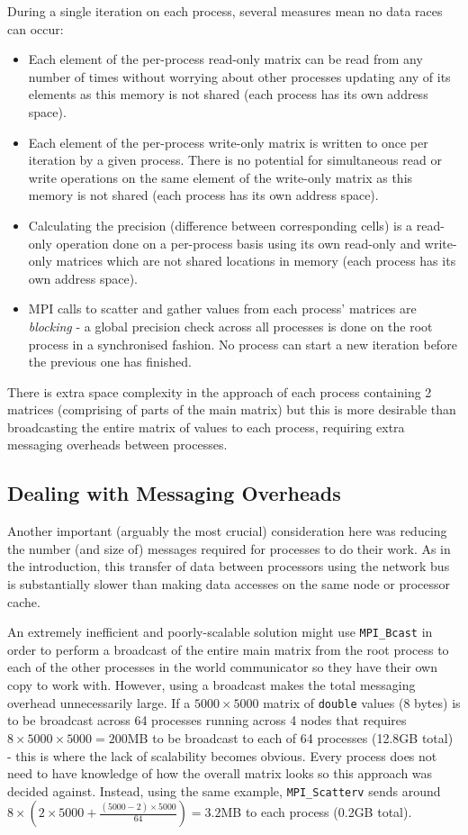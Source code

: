 \documentclass[11pt]{article}
\begin{document}
During a single iteration on each process, several measures mean no data races can occur:
\begin{itemize}
\item Each element of the per-process read-only matrix can be read from any number of times without worrying about other processes updating any of its elements as this memory is not shared (each process has its own address space). 
\item Each element of the per-process write-only matrix is written to once per iteration by a given process. There is no potential for simultaneous read or write operations on the same element of the write-only matrix  as this memory is not shared (each process has its own address space).
\item Calculating the precision (difference between corresponding cells) is a read-only operation done on a per-process basis using its own read-only and write-only matrices which are not shared locations in memory (each process has its own address space).
\item MPI calls to scatter and gather values from each process' matrices are \textit{blocking} - a global precision check across all processes is done on the root process in a synchronised fashion. No process can start a new iteration before the previous one has finished.
\end{itemize}

There is extra space complexity in the approach of each process containing 2 matrices (comprising of parts of the main matrix) but this is more desirable than broadcasting the entire matrix of values to each process, requiring extra messaging overheads between processes.

{\color{darkindigo}
\subsection*{Dealing with Messaging Overheads}}
Another important (arguably the most crucial) consideration here was reducing the number (and size of) messages required for processes to do their work. As in the introduction, this transfer of data between processors using the network bus is substantially slower than making data accesses on the same node or processor cache.

An extremely inefficient and poorly-scalable solution might use \texttt{MPI\_Bcast} in order to perform a broadcast of the entire main matrix from the root process to each of the other processes in the world communicator so they have their own copy to work with. However, using a broadcast makes the total messaging overhead unnecessarily large. If a $5000 \times 5000$ matrix of \texttt{double} values (8 bytes) is to be broadcast across 64 processes running across 4 nodes that requires $8 \times 5000 \times 5000 = 200$MB to be broadcast to each of 64 processes (12.8GB total) - this is where the lack of scalability becomes obvious. Every process does not need to have knowledge of how the overall matrix looks so this approach was decided against. Instead, using the same example, \texttt{MPI\_Scatterv} sends around $8 \times (2 \times 5000 + \frac{(5000-2) \times 5000}{64}) = 3.2$MB to each process (0.2GB total).
\end{document}
